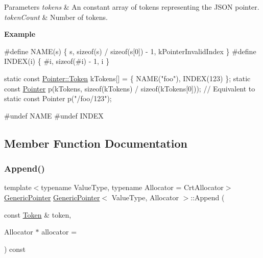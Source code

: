\begin{DoxyParams}{Parameters}
{\em tokens} & An constant array of tokens representing the J\+S\+ON pointer. \\
\hline
{\em token\+Count} & Number of tokens.\\
\hline
\end{DoxyParams}
{\bfseries Example} 
\begin{DoxyCode}
\textcolor{preprocessor}{#define NAME(s) \{ s, sizeof(s) / sizeof(s[0]) - 1, kPointerInvalidIndex \}}
\textcolor{preprocessor}{#define INDEX(i) \{ #i, sizeof(#i) - 1, i \}}

\textcolor{keyword}{static} \textcolor{keyword}{const} \hyperlink{struct_generic_pointer_1_1_token}{Pointer::Token} kTokens[] = \{ NAME(\textcolor{stringliteral}{"foo"}), INDEX(123) \};
\textcolor{keyword}{static} \textcolor{keyword}{const} \hyperlink{class_generic_pointer}{Pointer} p(kTokens, \textcolor{keyword}{sizeof}(kTokens) / \textcolor{keyword}{sizeof}(kTokens[0]));
\textcolor{comment}{// Equivalent to static const Pointer p("/foo/123");}

\textcolor{preprocessor}{#undef NAME}
\textcolor{preprocessor}{#undef INDEX}
\end{DoxyCode}
 

\subsection{Member Function Documentation}
\mbox{\label{class_generic_pointer_aa8f86c0f330807f337351a95ae254b78}} 
\subsubsection{\texorpdfstring{Append()}{Append()}\hspace{0.1cm}{\footnotesize\ttfamily [1/2]}}
{\footnotesize\ttfamily template$<$typename Value\+Type, typename Allocator = Crt\+Allocator$>$ \\
\hyperlink{class_generic_pointer}{Generic\+Pointer} \hyperlink{class_generic_pointer}{Generic\+Pointer}$<$ Value\+Type, Allocator $>$\+::Append (\begin{DoxyParamCaption}\item[{const \hyperlink{struct_generic_pointer_1_1_token}{Token} \&}]{token,  }\item[{Allocator $\ast$}]{allocator = {} }\end{DoxyParamCaption}) const\hspace{0.3cm}{\ttfamily [inline]}}



